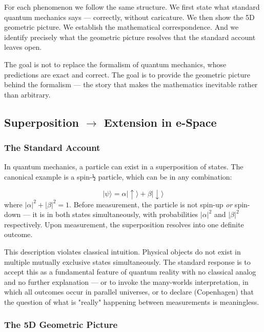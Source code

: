 \documentclass[aps,prd,preprint,superscriptaddress,longbibliography,floatfix]{revtex4-2}
\theoremstyle{remark}
\begin{document}
For each phenomenon we follow the same structure. We first state what standard quantum mechanics says --- correctly, without caricature. We then show the 5D geometric picture. We establish the mathematical correspondence. And we identify precisely what the geometric picture resolves that the standard account leaves open.

The goal is not to replace the formalism of quantum mechanics, whose predictions are exact and correct. The goal is to provide the geometric picture behind the formalism --- the story that makes the mathematics inevitable rather than arbitrary.



\subsection{Superposition $\to$ Extension in e-Space}


\subsubsection{The Standard Account}

In quantum mechanics, a particle can exist in a superposition of states. The canonical example is a spin-\texttt{½} particle, which can be in any combination:


\begin{equation}
    |\psi\rangle = \alpha|\uparrow\rangle + \beta|\downarrow\rangle
\end{equation}
where $|\alpha|^{2} + |\beta|^{2} = 1$. Before measurement, the particle is not spin-up \textit{or} spin-down --- it is in both states simultaneously, with probabilities $|\alpha|^{2}$ and $|\beta|^{2}$ respectively. Upon measurement, the superposition resolves into one definite outcome.

This description violates classical intuition. Physical objects do not exist in multiple mutually exclusive states simultaneously. The standard response is to accept this as a fundamental feature of quantum reality with no classical analog and no further explanation --- or to invoke the many-worlds interpretation, in which all outcomes occur in parallel universes, or to declare (Copenhagen) that the question of what is "really" happening between measurements is meaningless.


\subsubsection{The 5D Geometric Picture}
\end{document}

